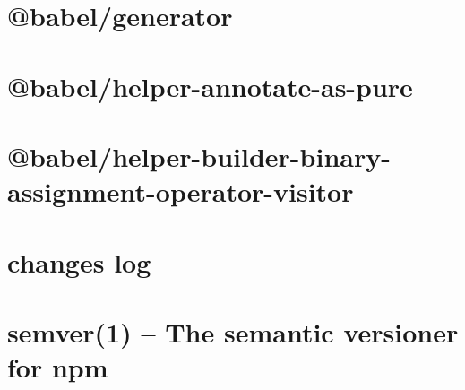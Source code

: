 \documentclass[twoside]{book}
\newcommand{\+}{\discretionary{\mbox{\scriptsize$\hookleftarrow$}}{}{}}
\begin{document}
\chapter{@babel/generator}
\label{md__c___users_vaishnavi_jadhav__desktop__developer_code_mean_stack_example_client_node_modules__babel_generator__r_e_a_d_m_e}

\chapter{@babel/helper-\/annotate-\/as-\/pure}
\label{md__c___users_vaishnavi_jadhav__desktop__developer_code_mean_stack_example_client_node_modules__90c9156f24b9abc1932d3b18a74127d9}

\chapter{@babel/helper-\/builder-\/binary-\/assignment-\/operator-\/visitor}
\label{md__c___users_vaishnavi_jadhav__desktop__developer_code_mean_stack_example_client_node_modules__314f84915f76416d228653ab01c2e6d9}

\chapter{changes log}
\label{md__c___users_vaishnavi_jadhav__desktop__developer_code_mean_stack_example_client_node_modules__0cb98df2de76b2d8d9f034576934a586}

\chapter{semver(1) -- The semantic versioner for npm}
\label{md__c___users_vaishnavi_jadhav__desktop__developer_code_mean_stack_example_client_node_modules__2abad6a7794204ebe2e3545b80fc640f}

\end{document}

